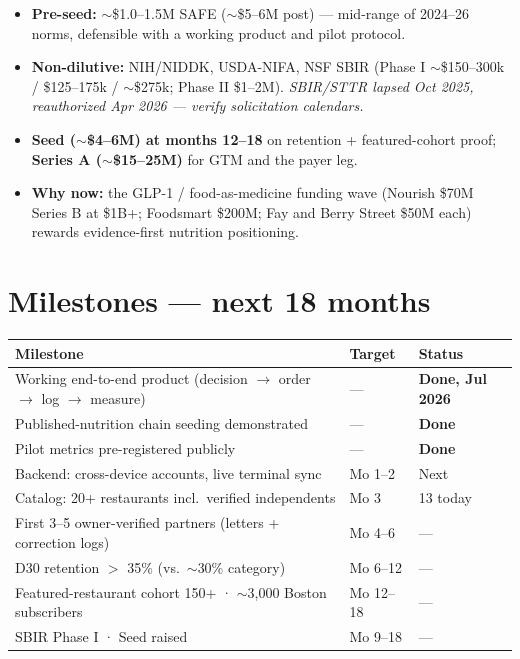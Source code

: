 \documentclass[10pt]{article}
\begin{document}
\begin{itemize}[leftmargin=1.4em,itemsep=3pt]
\item \textbf{Pre-seed:} $\sim$\$1.0--1.5M SAFE ($\sim$\$5--6M post) --- mid-range of 2024--26 norms, defensible with a working product and pilot protocol.
\item \textbf{Non-dilutive:} NIH/NIDDK, USDA-NIFA, NSF SBIR (Phase I $\sim$\$150--300k / \$125--175k / $\sim$\$275k; Phase II \$1--2M). \emph{SBIR/STTR lapsed Oct 2025, reauthorized Apr 2026 --- verify solicitation calendars.}
\item \textbf{Seed ($\sim$\$4--6M) at months 12--18} on retention + featured-cohort proof; \textbf{Series A ($\sim$\$15--25M)} for GTM and the payer leg.
\item \textbf{Why now:} the GLP-1 / food-as-medicine funding wave (Nourish \$70M Series B at \$1B+; Foodsmart \$200M; Fay and Berry Street \$50M each) rewards evidence-first nutrition positioning.
\end{itemize}

\section{Milestones --- next 18 months}

\begin{tabularx}{\textwidth}{@{}L l l@{}}
\toprule
\textbf{Milestone} & \textbf{Target} & \textbf{Status}\\
\midrule
Working end-to-end product (decision $\to$ order $\to$ log $\to$ measure) & --- & \textbf{Done, Jul 2026}\\
Published-nutrition chain seeding demonstrated & --- & \textbf{Done}\\
Pilot metrics pre-registered publicly & --- & \textbf{Done}\\
Backend: cross-device accounts, live terminal sync & Mo 1--2 & Next\\
Catalog: 20+ restaurants incl.\ verified independents & Mo 3 & 13 today\\
First 3--5 owner-verified partners (letters + correction logs) & Mo 4--6 & ---\\
D30 retention $>$ 35\% (vs.\ $\sim$30\% category) & Mo 6--12 & ---\\
Featured-restaurant cohort 150+ · $\sim$3{,}000 Boston subscribers & Mo 12--18 & ---\\
SBIR Phase I · Seed raised & Mo 9--18 & ---\\
\bottomrule
\end{tabularx}
\end{document}
